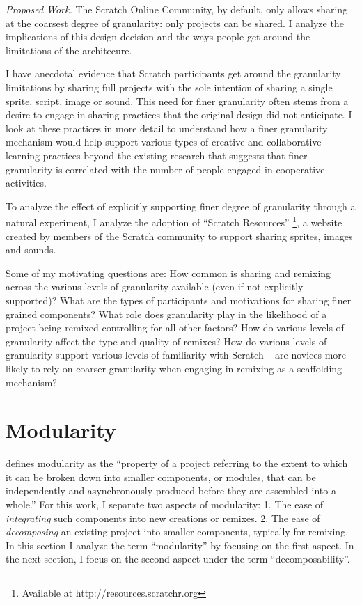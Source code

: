 \emph{Proposed Work.}
The Scratch Online Community, by default, only allows sharing at the coarsest degree of granularity: only projects can be shared. 
I analyze the implications of this design decision and the ways  people get around the limitations of the architecure.

I have anecdotal evidence that Scratch participants get around the granularity limitations by sharing full projects with the sole intention of sharing a single sprite, script, image or sound.
This need for finer granularity often stems from a desire to engage in sharing practices that the original design did not anticipate. 
I look at these practices in more detail to understand how a finer granularity mechanism would help support various types of creative and collaborative learning practices beyond the existing research that suggests that finer granularity is correlated with the number of people engaged in cooperative activities.

To analyze the effect of explicitly supporting finer degree of granularity through a natural experiment, I  analyze the adoption of ``Scratch Resources'' \footnote{Available at http://resources.scratchr.org}, a website created by members of the Scratch community to support sharing sprites, images and sounds. 

Some of my motivating questions are: 
How common is sharing and remixing across the various levels of granularity available (even if not explicitly supported)?
What are the types of participants and motivations for sharing finer grained components?
What role does granularity play in the likelihood of a project being remixed controlling for all other factors?
How do various levels of granularity affect the type and quality of remixes?
How do various levels of granularity support various levels of familiarity with Scratch -- are novices more likely to rely on coarser granularity when engaging in remixing as a scaffolding mechanism?

\section{Modularity}
\citet{benkler_coases_2002} defines modularity as the ``property of a project referring to the extent to which it can be broken down into smaller components, or modules, that can be independently and asynchronously produced before they are assembled into a whole.''
For this work, I separate two aspects of modularity:
1. The ease of \emph{integrating} such components into new creations or remixes.
2. The ease of \emph{decomposing} an existing project into smaller components, typically for remixing.
In this section I  analyze the term ``modularity'' by focusing on the first aspect.
In the next section, I focus on the second aspect under the term ``decomposability''.

